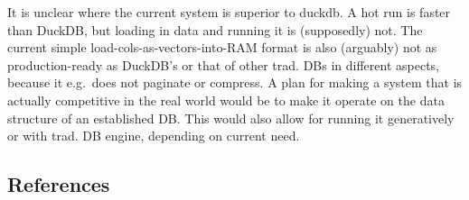 \documentclass[
  10pt,
]{article}
\begin{document}
It is unclear where the current system is superior to duckdb. A hot run
is faster than DuckDB, but loading in data and running it is
(supposedly) not. The current simple load-cols-as-vectors-into-RAM
format is also (arguably) not as production-ready as DuckDB's or that of
other trad. DBs in different aspects, because it e.g.~does not paginate
or compress. A plan for making a system that is actually competitive in
the real world would be to make it operate on the data structure of an
established DB. This would also allow for running it generatively or
with trad. DB engine, depending on current need.

\subsection{References}\label{references}
\end{document}
